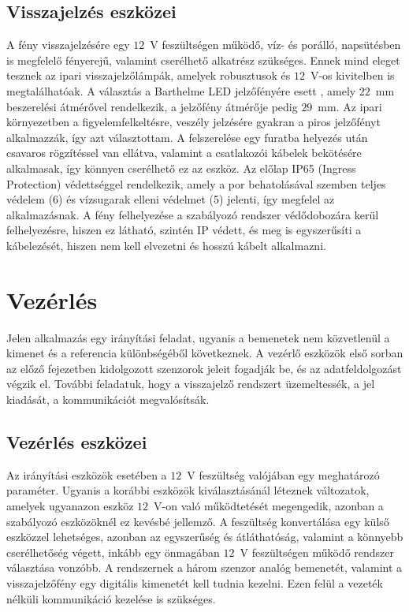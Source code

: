 \subsection{Visszajelzés eszközei}

A fény visszajelzésére egy $12$~V feszültségen működő, víz- és porálló, napsütésben is megfelelő fényerejű, valamint cserélhető alkatrész szükséges. Ennek mind eleget tesznek az ipari visszajelzőlámpák, amelyek robusztusok és $12$~V-os kivitelben is megtalálhatóak. A választás a Barthelme LED jelzőfényére esett \cite{barthelme_led}, amely $22$~mm beszerelési átmérővel rendelkezik, a jelzőfény átmérője pedig $29$~mm. Az ipari környezetben a figyelemfelkeltésre, veszély jelzésére gyakran a piros jelzőfényt alkalmazzák, így azt választottam. A felszerelése egy furatba helyezés után csavaros rögzítéssel van ellátva, valamint a csatlakozói kábelek bekötésére alkalmasak, így könnyen cserélhető ez az eszköz. Az előlap IP65 (Ingress Protection) védettséggel rendelkezik, amely a por behatolásával szemben teljes védelem (6) és vízsugarak elleni védelmet (5) jelenti, így megfelel az alkalmazásnak. A fény felhelyezése a szabályozó rendszer védődobozára kerül felhelyezésre, hiszen ez látható, szintén IP védett, és meg is egyszerűsíti a kábelezését, hiszen nem kell elvezetni és hosszú kábelt alkalmazni.

\section{Vezérlés}
\label{szabalyozas}

Jelen alkalmazás egy irányítási feladat, ugyanis a bemenetek nem közvetlenül a kimenet és a referencia különbségéből következnek. A vezérlő eszközök első sorban az előző fejezetben kidolgozott szenzorok jeleit fogadják be, és az adatfeldolgozást végzik el. További feladatuk, hogy a visszajelző rendszert üzemeltessék, a jel kiadását, a kommunikációt megvalósítsák. 

\subsection{Vezérlés eszközei}

Az irányítási eszközök esetében a $12$~V feszültség valójában egy meghatározó paraméter. Ugyanis a korábbi eszközök kiválasztásánál léteznek változatok, amelyek ugyanazon eszköz $12$~V-on való működtetését megengedik, azonban a szabályozó eszközöknél ez kevésbé jellemző. A feszültség konvertálása egy külső eszközzel lehetséges, azonban az egyszerűség és átláthatóság, valamint a könnyebb cserélhetőség végett, inkább egy önmagában $12$~V feszültségen működő rendszer választása vonzóbb. A rendszernek a három szenzor analóg bemenetét, valamint a visszajelzőfény egy digitális kimenetét kell tudnia kezelni. Ezen felül a vezeték nélküli kommunikáció kezelése is szükséges.

